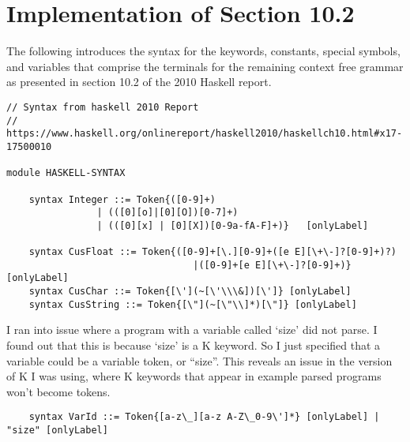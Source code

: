 \section{Implementation of Section 10.2}
The following introduces the syntax for the keywords, constants, special symbols, and variables that comprise the terminals for the remaining context free grammar as presented in section 10.2 of the 2010 Haskell report.

\begin{lstlisting}
// Syntax from haskell 2010 Report
// https://www.haskell.org/onlinereport/haskell2010/haskellch10.html#x17-17500010

module HASKELL-SYNTAX

    syntax Integer ::= Token{([0-9]+)
                | (([0][o]|[0][O])[0-7]+) 
                | (([0][x] | [0][X])[0-9a-fA-F]+)}   [onlyLabel]

    syntax CusFloat ::= Token{([0-9]+[\.][0-9]+([e E][\+\-]?[0-9]+)?)
                                 |([0-9]+[e E][\+\-]?[0-9]+)} [onlyLabel]
    syntax CusChar ::= Token{[\'](~[\'\\\&])[\']} [onlyLabel]
    syntax CusString ::= Token{[\"](~[\"\\]*)[\"]} [onlyLabel]
\end{lstlisting}
I ran into issue where a program with a variable called ‘size’ did not parse. I found out that this is because ‘size’ is a K keyword. So I just specified that a variable could be a variable token, or “size”. This reveals an issue in the version of K I was using, where K keywords that appear in example parsed programs won't become tokens.
\begin{lstlisting}
    syntax VarId ::= Token{[a-z\_][a-z A-Z\_0-9\']*} [onlyLabel] | "size" [onlyLabel]
\end{lstlisting}
